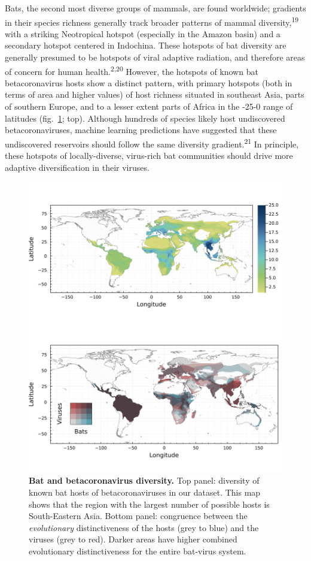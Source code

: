\documentclass[10pt,oneside]{article}
\makeatletter
\def\maxwidth{\ifdim\Gin@nat@width>\linewidth\linewidth
\else\Gin@nat@width\fi}
\let\Oldincludegraphics\includegraphics
\renewcommand{\includegraphics}[1]{\Oldincludegraphics[width=\maxwidth]{#1}}
\makeatother
\begin{document}
Bats, the second most diverse groups of mammals, are found worldwide;
gradients in their species richness generally track broader patterns of
mammal diversity,\textsuperscript{19} with a striking Neotropical
hotspot (especially in the Amazon basin) and a secondary hotspot
centered in Indochina. These hotspots of bat diversity are generally
presumed to be hotspots of viral adaptive radiation, and therefore areas
of concern for human health.\textsuperscript{2,20} However, the hotspots
of known bat betacoronavirus hosts show a distinct pattern, with primary
hotspots (both in terms of area and higher values) of host richness
situated in southeast Asia, parts of southern Europe, and to a lesser
extent parts of Africa in the -25-0 range of latitudes
(fig.~\ref{fig:richness}; top). Although hundreds of species likely host
undiscovered betacoronaviruses, machine learning predictions have
suggested that these undiscovered reservoirs should follow the same
diversity gradient.\textsuperscript{21} In principle, these hotspots of
locally-diverse, virus-rich bat communities should drive more adaptive
diversification in their viruses.

\begin{figure}
\hypertarget{fig:richness}{%
\centering
\includegraphics{figures/combined_richness.png}
\caption{\textbf{Bat and betacoronavirus diversity.} Top panel:
diversity of known bat hosts of betacoronaviruses in our dataset. This
map shows that the region with the largest number of possible hosts is
South-Eastern Asia. Bottom panel: congruence between the
\emph{evolutionary} distinctiveness of the hosts (grey to blue) and the
viruses (grey to red). Darker areas have higher combined evolutionary
distinctiveness for the entire bat-virus system.}\label{fig:richness}
}
\end{figure}
\end{document}
